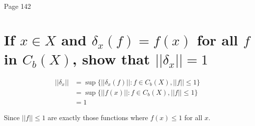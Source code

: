 \documentclass{article}
\begin{document}
Page 142
\section{If $x \in X$ and $\delta_x(f) = f(x)$ for all $f$ in $C_b(X)$, show that $||\delta_x|| = 1$}

\begin{align}
|| \delta_x ||  &= \sup\{ || \delta_x(f) || : f \in C_b(X), || f || \le 1 \}  \\
&= \sup\{ || f(x) || : f \in C_b(X), || f || \le 1 \} \\
&= 1
\end{align}

Since $|| f || \le 1$ are exactly those functions where $f(x) \le 1 $ for all $x$.
\end{document}
